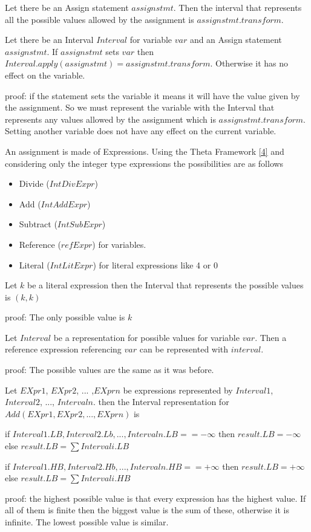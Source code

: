 \begin{definition}
	Let there be an Assign statement $assignstmt$. Then the interval that represents all the possible values allowed by the assignment is $assignstmt.transform$.
\end{definition}

\begin{theorem}
	Let there be an Interval $Interval$ for variable $var$ and an Assign statement $assignstmt$. If $assignstmt$ sets $var$ then
	$Interval.apply(assignstmt)=assignstmt.transform$. Otherwise it has no effect on the variable.
\end{theorem}
{proof: } if the statement sets the variable it means it will have the value given by the assignment. So we must represent the variable with the Interval that represents any values allowed by the assignment which is $assignstmt.transform$. Setting another variable does not have any effect on the current variable.

An assignment is made of Expressions. Using the Theta Framework \hyperref[sec:ref]{[4]} and considering only the integer type expressions the possibilities are as follows
\begin{itemize}
	\item Divide ($IntDivExpr$)
	\item Add ($IntAddExpr$)
	\item Subtract ($IntSubExpr$)
	\item Reference ($refExpr$) for variables.
	\item Literal ($IntLitExpr$) for literal expressions like 4 or 0
\end{itemize}

\begin{theorem}
	Let $k$ be a literal expression then the Interval that represents the possible values is $(k, k)$
\end{theorem}
{proof: } The only possible value is $k$

\begin{theorem}
	Let $Interval$ be a representation for possible values for variable $var$. Then a reference expression referencing $var$ can be represented with $interval$.
\end{theorem}
{proof: } The possible values are the same as it was before.

\begin{theorem}
	Let $EXpr1$, $EXpr2$, ... ,$EXprn$ be expressions represented by $Interval1$, $Interval2$, ..., $Intervaln$. then the Interval representation for $Add(EXpr1, EXpr2, ... ,EXprn)$ is
	
	if $Interval1.LB, Interval2.Lb, ... ,Intervaln.LB == -\infty$ then $result.LB=-\infty$
	else  $result.LB=\sum{Intervali.LB}$
	
	if $Interval1.HB, Interval2.Hb, ... ,Intervaln.HB == +\infty$ then $result.LB=+\infty$
	else  $result.LB=\sum{Intervali.HB}$
\end{theorem}
{proof: } the highest possible value is that every expression has the highest value. If all of them is finite then the biggest value is the sum of these, otherwise it is infinite. The lowest possible value is similar.

